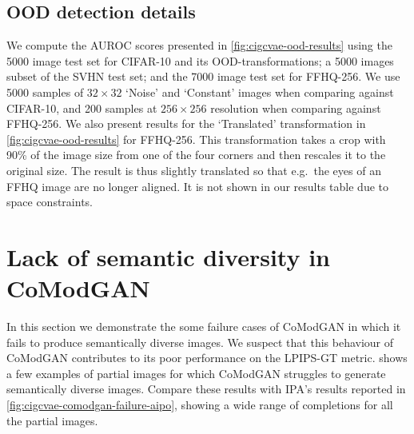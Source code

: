 \subsection{OOD detection details} We compute the AUROC scores presented in
\cref{fig:cigcvae-ood-results} using the 5000 image test set for CIFAR-10 and its
OOD-transformations; a 5000 images subset of the SVHN test set; and the 7000
image test set for FFHQ-256. We use 5000 samples of $32\times32$ `Noise' and
`Constant' images when comparing against CIFAR-10, and 200 samples at
$256\times256$ resolution when comparing against FFHQ-256. We also present results for the `Translated' transformation in
\cref{fig:cigcvae-ood-results} for FFHQ-256. This transformation takes a crop with 90\%
of the image size from one of the four corners and then rescales it to the
original size. The result is thus slightly translated so that e.g.~the eyes of
an FFHQ image are no longer aligned. It is not shown in our results table due to
space constraints.


\section{Lack of semantic diversity in CoModGAN} \label{supp:cigcvae-comodgan-failure}
In this section we demonstrate the some failure cases of CoModGAN in which it
fails to produce semantically diverse images. We suspect that this behaviour of
CoModGAN contributes to its poor performance on the LPIPS-GT metric.
 shows a few examples of partial images for which
CoModGAN struggles to generate semantically diverse images. Compare these
results with IPA's results reported in \cref{fig:cigcvae-comodgan-failure-aipo},
showing a wide range of completions for all the partial images.

\newcommand{\cmgfailureimgheight}{0.8cm}


